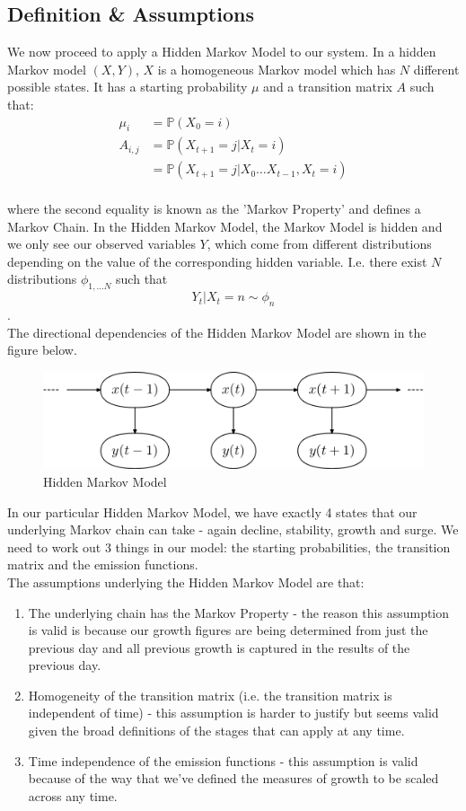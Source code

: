 \documentclass[12pt]{article}
\newcommand{\Prob}{\mathbb{P}}
\begin{document}
\subsection{Definition \& Assumptions}
We now proceed to apply a Hidden Markov Model to our system. In a hidden Markov model $(X,Y)$, $X$ is a homogeneous Markov model which has $N$ different possible states. It has a starting probability $\mu$ and a transition matrix $A$ such that:
\begin{align*}
\mu_i &= \Prob(X_0=i)\\
A_{i,j} &= \Prob (X_{t+1} = j \vert X_t = i)\\
&= \Prob(X_{t+1} = j \vert X_0\ldots X_{t-1},X_t = i)
\end{align*}\\
where the second equality is known as the 'Markov Property' and defines a Markov Chain. In the Hidden Markov Model, the Markov Model is hidden and we only see our observed variables $Y$, which come from different distributions depending on the value of the corresponding hidden variable. I.e. there exist $N$ distributions $\phi_{1,\ldots N}$ such that $$ Y_t \vert X_t = n \sim \phi_n$$. \\The directional dependencies of the Hidden Markov Model are shown in the figure below.
\FloatBarrier
\begin{figure}[hbtp]\centering
\caption{Hidden Markov Model}
\includegraphics[width=\textwidth,clip]{images/MarkovChainExplanation.png}
\end{figure}
\FloatBarrier

In our particular Hidden Markov Model, we have exactly 4 states that our underlying Markov chain can take - again decline, stability, growth and surge. We need to work out 3 things in our model: the starting probabilities, the transition matrix and the emission functions.
\\
The assumptions underlying the Hidden Markov Model are that:
\begin{enumerate}
\item The underlying chain has the Markov Property - the reason this assumption is valid is because our growth figures are being determined from just the previous day and all previous growth is captured in the results of the previous day.
\item Homogeneity of the transition matrix (i.e. the transition matrix is independent of time) - this assumption is harder to justify but seems valid given the broad definitions of the stages that can apply at any time.
\item Time independence of the emission functions - this assumption is valid because of the way that we've defined the measures of growth to be scaled across any time.
\end{enumerate}
\end{document}
